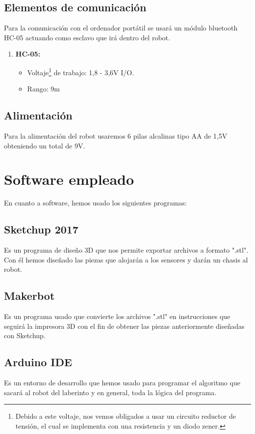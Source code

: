 \subsection{Elementos de comunicación}
Para la comunicación con el ordenador portátil se usará un módulo bluetooth HC-05 actuando como esclavo que irá dentro del robot.
\begin{enumerate}
	\item \textbf{HC-05:}
	\begin{itemize}
		\item Voltaje\footnote{Debido a este voltaje, nos vemos obligados a usar un circuito reductor de tensión, el cual se implementa con una resistencia y un diodo zener.} de trabajo: 1,8 - 3,6V I/O.
		\item Rango: 9m
	\end{itemize}
\end{enumerate}
\subsection{Alimentación}
Para la alimentación del robot usaremos 6 pilas alcalinas tipo AA de 1,5V obteniendo un total de 9V.

\section{Software empleado}
En cuanto a software, hemos usado los siguientes programas:
\subsection{Sketchup 2017}
Es un programa de diseño 3D que nos permite exportar archivos a formato ".stl". Con él hemos diseñado las piezas que alojarán a los sensores y darán un chasis al robot.
\subsection{Makerbot}
Es un programa usado que convierte los archivos ".stl" en instrucciones que seguirá la impresora 3D con el fin de obtener las piezas anteriormente diseñadas con Sketchup. 
\subsection{Arduino IDE}
Es un entorno de desarrollo que hemos usado para programar el algoritmo que sacará al robot del laberinto y en general, toda la lógica del programa.
